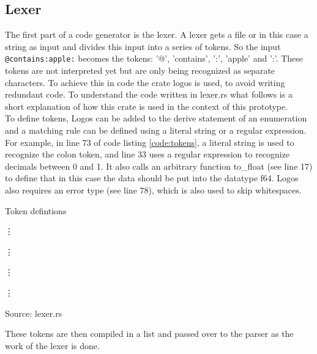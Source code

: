 \subsection{Lexer}
The first part of a code generator is the lexer. A lexer gets a file or in this case a string as input and divides this input into a series of tokens. So the input \lstinline[language=Fulltext-Search]$@contains:apple:$ becomes the tokens: '@', 'contains', ':', 'apple' and ':'. These tokens are not interpreted yet but are only being recognized as separate characters. To achieve this in code the crate logos is used, to avoid writing redundant code. To understand the code written in lexer.rs what follows is a short explanation of how this crate is used in the context of this prototype.\\
To define tokens, Logos can be added to the derive statement of an enumeration and a matching rule can be defined using a literal string or a regular expression. For example, in line 73 of code listing \ref{code:tokens}, a literal string is used to recognize the colon token, and line 33 uses a regular expression to recognize decimals between 0 and 1. It also calls an arbitrary function to\_float (see line 17) to define that in this case the data should be put into the datatype f64. Logos also requires an error type (see line 78), which is also used to skip whitespaces. \parencite[cf.][n.p.]{hirsz_logos_2022}
\begin{mycapcode}[H]
    \caption{Token defintions}
    \label{code:tokens}
    
    \vdots
    
    \vdots
    
    \vdots
    
    \vdots
    
    \centerline{Source: lexer.rs}
\end{mycapcode}
These tokens are then compiled in a list and passed over to the parser as the work of the lexer is done.
